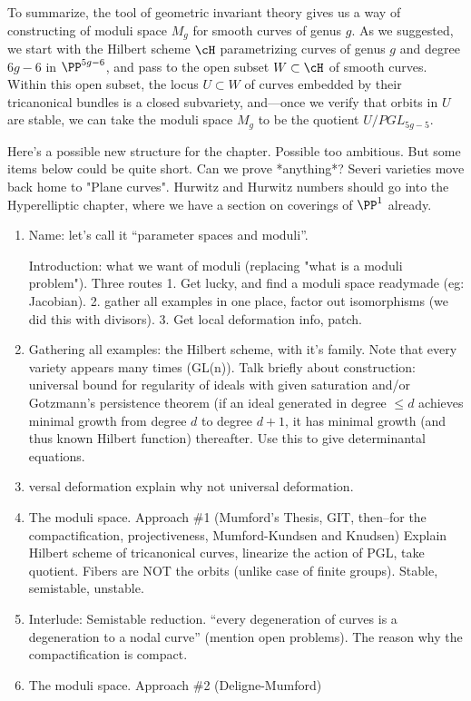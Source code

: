 To summarize, the tool of geometric invariant theory gives us a way of constructing of moduli space $M_g$ for smooth  curves of genus $g$. As we suggested, we start with the Hilbert scheme $\cH$ parametrizing curves of genus $g$ and degree $6g-6$ in $\PP^{5g-6}$, and pass to the open subset $W \subset \cH$ of smooth curves. Within this open subset, the locus $U \subset W$ of curves embedded by their tricanonical bundles is a closed subvariety, and---once we verify that orbits in $U$ are stable, we can take the moduli space $M_g$ to be the quotient $U/PGL_{5g-5}$.



\newpage

Here's a possible new structure for the chapter. Possible too ambitious. But some items below could be quite short. Can we prove *anything*? Severi varieties move back home to "Plane curves". Hurwitz and Hurwitz numbers should go into the Hyperelliptic chapter, where we have a section on coverings of $\PP^1$ already.

\begin{enumerate}
 \item Name: let's call it ``parameter spaces and moduli''.
 
 Introduction: what we want of moduli (replacing "what is a moduli problem"). Three routes
 1. Get lucky, and find a moduli space readymade (eg: Jacobian). 2.  gather all examples in one place, factor out isomorphisms (we did this with divisors). 3. Get local deformation info, patch.
 
 \item Gathering all examples:  the Hilbert scheme, with it's family. Note that every variety appears many times (GL(n)). Talk briefly about construction: universal bound for regularity of ideals with given saturation and/or Gotzmann's persistence theorem (if an ideal generated in degree $\leq d$ achieves minimal growth
 from degree $d$ to degree $d+1$, it has minimal growth (and thus known Hilbert function) thereafter.
 Use this to give determinantal equations.
 
 \item versal deformation explain why not universal deformation.
 
 \item The moduli space. Approach \#1 (Mumford's Thesis, GIT, then--for the compactification, projectiveness, Mumford-Kundsen and Knudsen) Explain Hilbert scheme of tricanonical curves, linearize the action of PGL, take quotient. Fibers are NOT the orbits (unlike case of finite groups). Stable, semistable, unstable. 
 
 \item Interlude: Semistable reduction. ``every degeneration of curves is a degeneration to a nodal curve''
(mention open problems). The reason why the compactification is compact.

\item The moduli space. Approach \#2 (Deligne-Mumford)

\end{enumerate}


